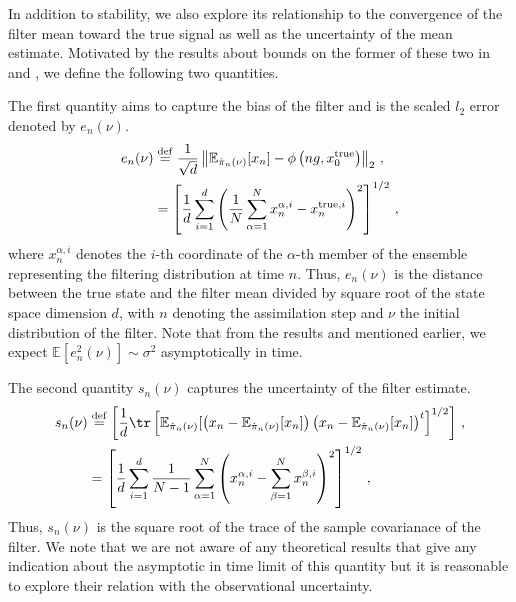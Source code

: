 In addition to stability, we also explore its relationship to the convergence of the filter mean toward the true signal as well as the uncertainty of the mean estimate. Motivated by the results about bounds on the former of these two in~\cite[Theorem~4.4]{KLS14} and \cite[Theorem~4.6]{law2016filter}, we define the following two quantities.

The first quantity aims to capture the bias of the filter and is the scaled $l_2$ error denoted by $e_n(\nu)$.
\begin{align}
    e_n(\nu) &\stackrel{\rm def}{=} \frac{1}{\sqrt{d}} \left\| \mathbb{E}_{\hat\pi_n(\nu)}[x_n] - \phi\left(ng, x_0^{\text{true}}\right) \right\|_2 \,, \nonumber \\
    &= \left[ \frac{1}{d} \sum_{i=1}^d \left(\frac{1}{N} \sum_{\alpha=1}^N x_n^{\alpha,i} - x_n^{\text{true}, i} \right)^2 \right]^{1/2} \,, \label{eq-error--probing-nfs}
\end{align}
where $x_n^{\alpha,i}$ denotes the $i$-th coordinate of the $\alpha$-th member of the ensemble representing the filtering distribution at time $n$. Thus, $e_n(\nu)$ is the distance between the true state and the filter mean divided by square root of the state space dimension $d$, with $n$ denoting the assimilation step and $\nu$ the initial distribution of the filter. Note that from the results \cite[Theorem~4.4]{KLS14} and \cite[Theorem~4.6]{law2016filter} mentioned earlier, we expect $\mathbb{E}[e_n^2(\nu)] \sim \sigma^2$ asymptotically in time.

The second quantity $s_n(\nu)$ captures the uncertainty of the filter estimate.
\begin{align}
    s_n(\nu) & \stackrel{\rm def}{=} \left[ \frac{1}{d} \tr \left[ \mathbb{E}_{\hat\pi_n(\nu)}[\left(x_n - \mathbb{E}_{\hat\pi_n(\nu)}[x_n] \right)\left(x_n - \mathbb{E}_{\hat\pi_n(\nu)}[x_n] \right)^t \right]^{1/2} \right] \,, \nonumber \\ 
    &= \left[ \frac{1}{d} \sum_{i=1}^d \frac{1}{N-1} \sum_{\alpha=1}^N \left(x_n^{\alpha,i} - \sum_{\beta=1}^N x_n^{\beta,i} \right)^2 \right]^{1/2}\,, \label{eq-var--probing-nfs}
\end{align}
 Thus, $s_n(\nu)$ is the square root of the trace of the sample covarianace of the filter. We note that we are not aware of any theoretical results that give any indication about the asymptotic in time limit of this quantity but it is reasonable to explore their relation with the observational uncertainty.
 
















